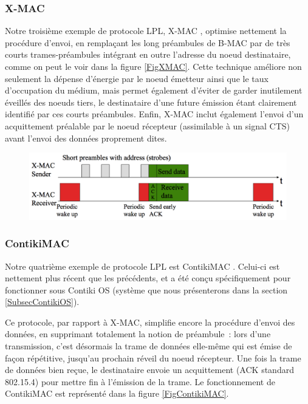 \subsubsection{X-MAC}
\label{ParXMAC}

Notre troisième exemple de protocole LPL, X-MAC \cite{XMAC}, optimise
nettement la procédure d'envoi, en remplaçant les long préambules de B-MAC
par de très courts trames-préambules intégrant en outre l'adresse du
noeud destinataire, comme on peut le voir dans la figure \vref{FigXMAC}.
Cette technique améliore non seulement la dépense d'énergie par le noeud
émetteur ainsi que le taux d'occupation du médium, mais permet également
d'éviter de garder inutilement éveillés des noeuds tiers, le destinataire
d'une future émission étant clairement identifié par ces courts préambules.
Enfin, X-MAC inclut également l'envoi d'un acquittement préalable par le
noeud récepteur (assimilable à un signal CTS) avant l'envoi des données
proprement dites. 

\begin{figure}[!hbt]
\centering
\includegraphics[width=12.5cm]{images/ch3-x-mac.png}
\label{FigXMAC}
\end{figure}

\subsubsection{ContikiMAC}
\label{ParContikiMAC}

Notre quatrième exemple de protocole LPL est ContikiMAC \cite{ContikiMAC}.
Celui-ci est nettement plus récent que les précédents, et a été conçu
spécifiquement pour fonctionner sous Contiki OS (système que nous
présenterons dans la section \vref{SubsecContikiOS}).

Ce protocole, par rapport à X-MAC, simplifie encore la procédure d'envoi
des données, en supprimant totalement la notion de préambule~: lors d'une
transmission, c'est désormais la trame de données elle-même qui est
émise de façon répétitive, jusqu'au prochain réveil du noeud récepteur.
Une fois la trame de données bien reçue, le destinataire envoie un
acquittement (ACK standard 802.15.4) pour mettre fin à l'émission de la
trame. Le fonctionnement de ContikiMAC est représenté
dans la figure \vref{FigContikiMAC}.

